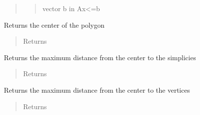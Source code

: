 \documentclass[letterpaper,10pt,english]{sphinxmanual}
\begin{document}
\begin{fulllineitems}
\begin{fulllineitems}
\begin{quote}
\begin{description}
\begin{quote}
vector b in Ax\textless{}=b
\end{quote}

\end{description}\end{quote}

\end{fulllineitems}



\begin{fulllineitems}
Returns the center of the polygon
\begin{quote}\begin{description}
\item[{Returns}] \leavevmode
\href{http://docs.scipy.org/doc/numpy/reference/generated/numpy.ndarray.html\#numpy.ndarray}{}

\end{description}\end{quote}

\end{fulllineitems}



\begin{fulllineitems}
Returns the maximum distance from the center to the simplicies
\begin{quote}\begin{description}
\item[{Returns}] \leavevmode
\href{http://docs.scipy.org/doc/numpy/reference/generated/numpy.ndarray.html\#numpy.ndarray}{}

\end{description}\end{quote}

\end{fulllineitems}



\begin{fulllineitems}
Returns the maximum distance from the center to the vertices
\begin{quote}\begin{description}
\item[{Returns}] \leavevmode
\href{http://docs.scipy.org/doc/numpy/reference/generated/numpy.ndarray.html\#numpy.ndarray}{}

\end{description}\end{quote}


\end{fulllineitems}
\end{fulllineitems}
\end{document}
